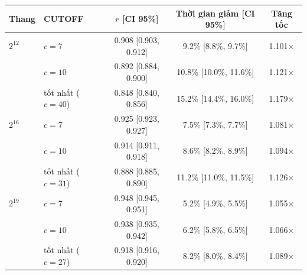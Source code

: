 \begin{tabular}{llccc}
\toprule
Thang & CUTOFF & $r$ [CI 95\%] & Thời gian giảm [CI 95\%] & Tăng tốc \\
\midrule
$2^{12}$ & $c=7$ & 0.908 [0.903, 0.912] & 9.2\% [8.8\%, 9.7\%] & 1.101$\times$ \\
 & $c=10$ & 0.892 [0.884, 0.900] & 10.8\% [10.0\%, 11.6\%] & 1.121$\times$ \\
 & tốt nhất ($c=40$) & 0.848 [0.840, 0.856] & 15.2\% [14.4\%, 16.0\%] & 1.179$\times$ \\
\addlinespace
$2^{16}$ & $c=7$ & 0.925 [0.923, 0.927] & 7.5\% [7.3\%, 7.7\%] & 1.081$\times$ \\
 & $c=10$ & 0.914 [0.911, 0.918] & 8.6\% [8.2\%, 8.9\%] & 1.094$\times$ \\
 & tốt nhất ($c=31$) & 0.888 [0.885, 0.890] & 11.2\% [11.0\%, 11.5\%] & 1.126$\times$ \\
\addlinespace
$2^{19}$ & $c=7$ & 0.948 [0.945, 0.951] & 5.2\% [4.9\%, 5.5\%] & 1.055$\times$ \\
 & $c=10$ & 0.938 [0.935, 0.942] & 6.2\% [5.8\%, 6.5\%] & 1.066$\times$ \\
 & tốt nhất ($c=27$) & 0.918 [0.916, 0.920] & 8.2\% [8.0\%, 8.4\%] & 1.089$\times$ \\
\bottomrule
\end{tabular}
